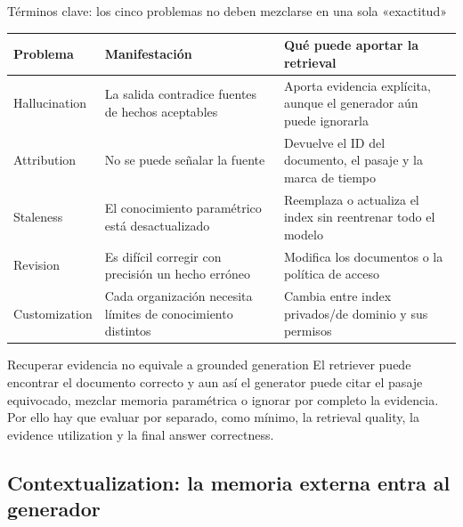 
\begin{knowledgebox}{Términos clave: los cinco problemas no deben mezclarse en una sola «exactitud»}
\begin{tabularx}{\textwidth}{L{0.18\textwidth}>{\raggedright\arraybackslash}X >{\raggedright\arraybackslash}X}
\toprule
Problema & Manifestación & Qué puede aportar la retrieval \\
\midrule
Hallucination & La salida contradice fuentes de hechos aceptables & Aporta evidencia explícita, aunque el generador aún puede ignorarla \\
Attribution & No se puede señalar la fuente & Devuelve el ID del documento, el pasaje y la marca de tiempo \\
Staleness & El conocimiento paramétrico está desactualizado & Reemplaza o actualiza el index sin reentrenar todo el modelo \\
Revision & Es difícil corregir con precisión un hecho erróneo & Modifica los documentos o la política de acceso \\
Customization & Cada organización necesita límites de conocimiento distintos & Cambia entre index privados/de dominio y sus permisos \\
\bottomrule
\end{tabularx}
\end{knowledgebox}

\begin{warningbox}{Recuperar evidencia no equivale a grounded generation}
El retriever puede encontrar el documento correcto y aun así el generator puede citar el pasaje equivocado, mezclar memoria paramétrica o ignorar por completo la evidencia. Por ello hay que evaluar por separado, como mínimo, la retrieval quality, la evidence utilization y la final answer correctness.
\end{warningbox}


\subsection{Contextualization: la memoria externa entra al generador}

